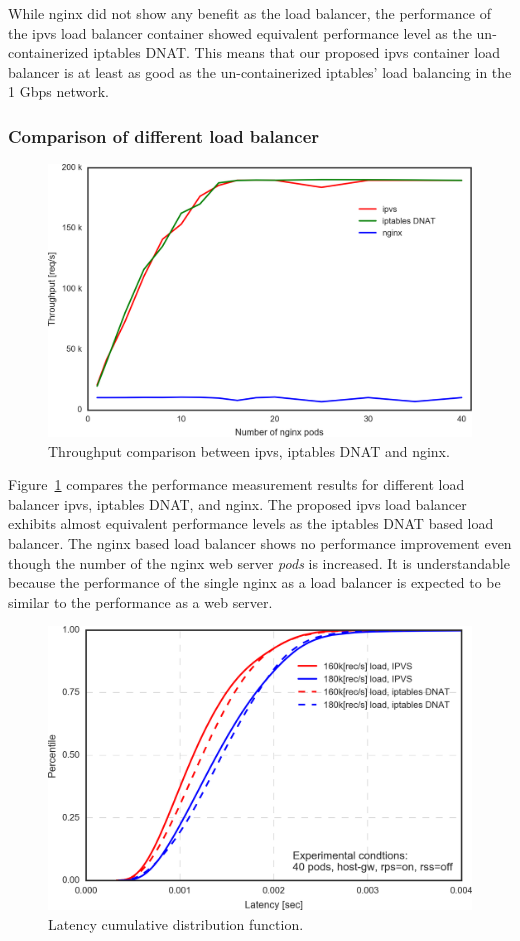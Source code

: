 While nginx did not show any benefit as the load balancer, the performance of the ipvs load balancer container showed equivalent performance level as the un-containerized iptables DNAT.
This means that our proposed ipvs container load balancer is at least as good as the un-containerized iptables' load balancing in the 1 Gbps network.

\subsubsection{Comparison of different load balancer}

\begin{figure}[h]
  \centering
  \includegraphics[width=0.8\columnwidth]{Figs/ipvs-iptables-nginx}
  \caption{Throughput comparison between ipvs, iptables DNAT and nginx.}
  \label{fig:ipvs-iptables-nginx}
\end{figure}

Figure~\ref{fig:ipvs-iptables-nginx} compares the performance measurement results for different load balancer ipvs, iptables DNAT, and nginx.
The proposed ipvs load balancer exhibits almost equivalent performance levels as the iptables DNAT based load balancer. 
The nginx based load balancer shows no performance improvement even though the number of the nginx web server {\em pods} is increased.
It is understandable because the performance of the single nginx as a load balancer is expected to be similar to the performance as a web server.

\begin{figure}[h]
  \centering
  \includegraphics[width=0.8\columnwidth]{Figs/latency_cdf_rps_40pods}
  \caption{Latency cumulative distribution function.}
  \label{fig:latency_cdf_rps_40pods}
\end{figure}

